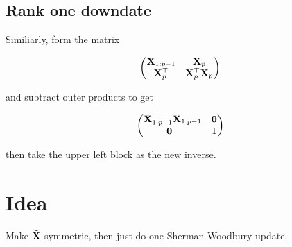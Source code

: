 \documentclass{amsart}
\begin{document}
\subsection{Rank one downdate}
Similiarly, form the matrix

\begin{equation*}
\begin{pmatrix}
{\bf X}_{1:p-1} & {\bf X}_p \\
{\bf X}_p^\top & {\bf X}_p^\top {\bf X}_p
\end{pmatrix}
\end{equation*}

and subtract outer products to get

\begin{equation*}
\begin{pmatrix}
{\bf X}_{1:p-1}^\top {\bf X}_{1:p-1} & {\bf 0} \\
{\bf 0}^\top & 1
\end{pmatrix}
\end{equation*}

then take the upper left block as the new inverse.

\section{Idea}
Make $\tilde{{\bf X}}$ symmetric, then just do one Sherman-Woodbury update.
\end{document}
